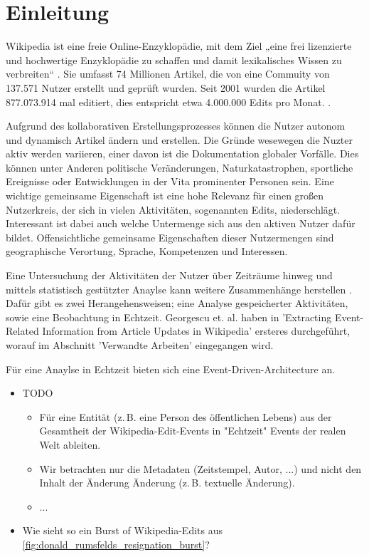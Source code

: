 \section{Einleitung}
Wikipedia ist eine freie Online-Enzyklopädie, mit dem Ziel „eine frei lizenzierte und hochwertige Enzyklopädie zu schaffen und damit lexikalisches Wissen zu verbreiten“ \cite{wales.}. Sie umfasst 74 Millionen Artikel, die von eine Commuity von 137.571 Nutzer erstellt und geprüft wurden. Seit 2001 wurden die Artikel 877.073.914 mal editiert, dies entspricht etwa 4.000.000 Edits pro Monat. \cite{wikistat}.

Aufgrund des kollaborativen Erstellungsprozesses können die Nutzer autonom und dynamisch Artikel ändern und erstellen. \cite{wikipedia.}
Die Gründe wesewegen die Nuzter aktiv werden variieren, einer davon ist die Dokumentation globaler Vorfälle. Dies können unter Anderen politische Veränderungen, Naturkatastrophen, sportliche Ereignisse oder Entwicklungen in der Vita prominenter Personen sein. Eine wichtige gemeinsame Eigenschaft ist eine hohe Relevanz für einen großen Nutzerkreis, der sich in vielen Aktivitäten, sogenannten Edits, niederschlägt. Interessant ist dabei auch welche Untermenge sich aus den aktiven Nutzer dafür bildet. Offensichtliche gemeinsame Eigenschaften dieser Nutzermengen sind geographische Verortung, Sprache, Kompetenzen und Interessen. 

Eine Untersuchung der Aktivitäten der Nutzer über Zeiträume hinweg und mittels statistisch gestützter Anaylse kann weitere Zusammenhänge herstellen \cite{10.1007978-3-642-36973-5_22}. Dafür gibt es zwei Herangehensweisen; eine Analyse gespeicherter Aktivitäten, sowie eine Beobachtung in Echtzeit. Georgescu et. al. haben in 'Extracting Event-Related Information from Article Updates in Wikipedia' ersteres durchgeführt, worauf im Abschnitt 'Verwandte Arbeiten' eingegangen wird. 

Für eine Anaylse in Echtzeit bieten sich eine Event-Driven-Architecture an. 

\begin{itemize}
    \item TODO
    \begin{itemize}
        \item Für eine Entität (z.\,B. eine Person des öffentlichen Lebens) aus der Gesamtheit der Wikipedia-Edit-Events in "Echtzeit" Events der realen Welt ableiten.
        \item Wir betrachten nur die Metadaten (Zeitstempel, Autor, ...) und nicht den Inhalt der Änderung Änderung (z.\,B. textuelle Änderung).
        \item ...
    \end{itemize}
    \item Wie sieht so ein Burst of Wikipedia-Edits aus \ref{fig:donald_rumsfelds_resignation_burst}?
\end{itemize}


